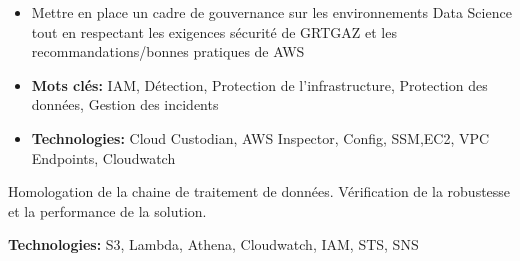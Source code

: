 \documentclass[10pt,a4paper,ragged2e]{altacv}
\begin{document}
\begin{paracol}{2}

\divider


\divider



\begin{itemize}
\item Mettre en place un cadre de gouvernance sur les environnements Data Science tout en respectant les exigences sécurité de GRTGAZ et les recommandations/bonnes pratiques de AWS
\item \textbf{Mots clés:} IAM, Détection, Protection de l'infrastructure, Protection des données, Gestion des incidents
\item \textbf{Technologies:} Cloud Custodian, AWS Inspector, Config, SSM,EC2, VPC Endpoints, Cloudwatch
\end{itemize}
\divider

\item Homologation de la chaine de traitement de données. Vérification de la robustesse et la performance de la solution.
\item \textbf{Technologies:} S3, Lambda, Athena, Cloudwatch, IAM, STS, SNS
\medskip


\end{paracol}
\end{document}
